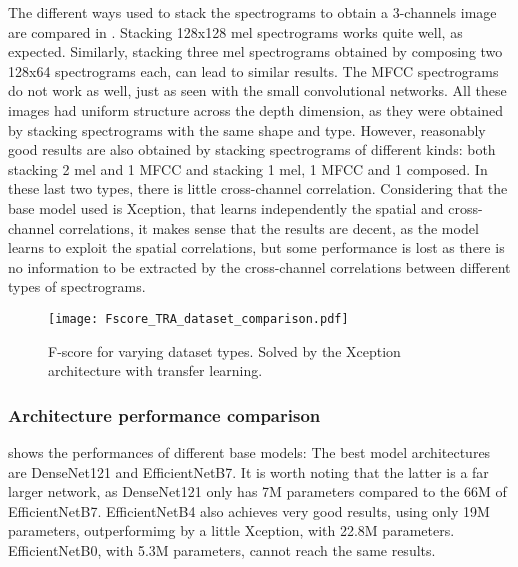 

The different ways used to stack the spectrograms to obtain a 3-channels image
are compared in .
Stacking 128x128 mel spectrograms works quite well, as expected.
Similarly, stacking three mel spectrograms obtained by composing two 128x64
spectrograms each, can lead to similar results.
The MFCC spectrograms do not work as well, just as seen with the small
convolutional networks.
All these images had uniform structure across the depth dimension, as they were
obtained by stacking spectrograms with the same shape and type.
However, reasonably good results are also obtained by stacking spectrograms of
different kinds: both stacking 2 mel and 1 MFCC and stacking 1 mel, 1 MFCC and
1 composed.
In these last two types, there is little cross-channel correlation.
Considering that the base model used is Xception, that learns independently the
spatial and cross-channel correlations, it makes sense that the results are
decent, as the model learns to exploit the spatial correlations, but some
performance is lost as there is no information to be extracted by the
cross-channel correlations between different types of spectrograms.

\begin{figure}[h!]
    \centering
    \texttt{[image: Fscore\_TRA\_dataset\_comparison.pdf]}
    \caption{F-score for varying
        dataset types.
        Solved by the Xception architecture with transfer learning.
    }%
    \label{fig:tra_comparison_dataset}
\end{figure}

\subsubsection{Architecture performance comparison}


 shows the performances of different base models:
The best model architectures are DenseNet121 and EfficientNetB7.
It is worth noting that the latter is a far larger network, as DenseNet121 only
has 7M parameters compared to the 66M of EfficientNetB7.
EfficientNetB4 also achieves very good results, using only 19M parameters,
outperformimg by a little Xception, with 22.8M parameters.
EfficientNetB0, with 5.3M parameters, cannot reach the same results.


